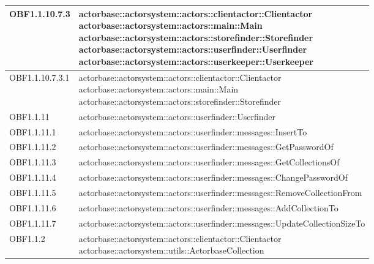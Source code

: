 \documentclass{scalatekids-article}
\begin{document}
\begin{longtable}[H]{|p{4.5cm}|p{13cm}|}
  \hline
  OBF1.1.10.7.3 & \multiLineCell[t]{actorbase::actorsystem::actors::clientactor::Clientactor\\actorbase::actorsystem::actors::main::Main\\actorbase::actorsystem::actors::storefinder::Storefinder\\actorbase::actorsystem::actors::userfinder::Userfinder\\actorbase::actorsystem::actors::userkeeper::Userkeeper\\}\\
  \hline
  OBF1.1.10.7.3.1 & \multiLineCell[t]{actorbase::actorsystem::actors::clientactor::Clientactor\\actorbase::actorsystem::actors::main::Main\\actorbase::actorsystem::actors::storefinder::Storefinder\\}\\
  \hline
  OBF1.1.11 & \multiLineCell[t]{actorbase::actorsystem::actors::userfinder::Userfinder\\}\\
  \hline
  OBF1.1.11.1 & \multiLineCell[t]{actorbase::actorsystem::actors::userfinder::messages::InsertTo\\}\\
  \hline
  OBF1.1.11.2 & \multiLineCell[t]{actorbase::actorsystem::actors::userfinder::messages::GetPasswordOf\\}\\
  \hline
  OBF1.1.11.3 & \multiLineCell[t]{actorbase::actorsystem::actors::userfinder::messages::GetCollectionsOf\\}\\
  \hline
  OBF1.1.11.4 & \multiLineCell[t]{actorbase::actorsystem::actors::userfinder::messages::ChangePasswordOf\\}\\
  \hline
  OBF1.1.11.5 & \multiLineCell[t]{actorbase::actorsystem::actors::userfinder::messages::RemoveCollectionFrom\\}\\
  \hline
  OBF1.1.11.6 & \multiLineCell[t]{actorbase::actorsystem::actors::userfinder::messages::AddCollectionTo\\}\\
  \hline
  OBF1.1.11.7 & \multiLineCell[t]{actorbase::actorsystem::actors::userfinder::messages::UpdateCollectionSizeTo\\}\\
  \hline
  OBF1.1.2 & \multiLineCell[t]{actorbase::actorsystem::actors::clientactor::Clientactor\\actorbase::actorsystem::utils::ActorbaseCollection\\}\\

\end{longtable}
\end{document}
